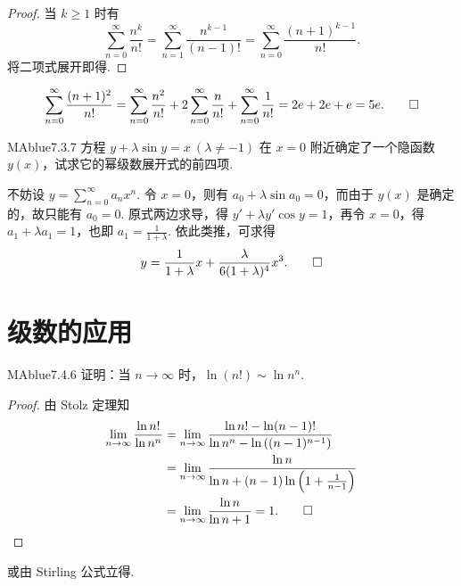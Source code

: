 \begin{enumerate}
\begin{solution}
\begin{center}
\begin{minipage}{0.85\textwidth}
\begin{lemma}{}{}
\begin{proof}
                        当 $k \geqslant 1$ 时有
                        \[
                            \sum_{n=0}^\infty \frac{n^k}{n!} = \sum_{n=1}^\infty \frac{n^{k-1}}{(n-1)!} = \sum_{n=0}^\infty \frac{(n+1)^{k-1}}{n!}.
                        \]
                        将二项式展开即得.
                    \end{proof}
                \end{lemma}
            \end{minipage}
        \end{center}
        \[
            \sum_{n=0}^{\infty} \frac{(n+1)^2}{n!} = \sum_{n=0}^{\infty} \frac{n^2}{n!} + 2 \sum_{n=0}^{\infty} \frac n {n!} + \sum_{n=0}^{\infty} \frac 1 {n!} = 2e + 2e + e = 5e. \qedhere
        \]
    \end{solution}
\end{enumerate}

\begin{problem}{MAblue}{7.3.7}
    方程 $y + \lambda \sin y = x \ (\lambda \neq -1)$ 在 $x = 0$ 附近确定了一个隐函数 $y(x)$，试求它的幂级数展开式的前四项.
\end{problem}

\begin{solution}
    不妨设 $y = \sum_{n=0}^{\infty} a_n x^n$. 令 $x = 0$，则有 $a_0 + \lambda \sin a_0 = 0$，而由于 $y(x)$ 是确定的，故只能有 $a_0 = 0$. 原式两边求导，得 $y' + \lambda y' \cos y = 1$，再令 $x = 0$，得 $a_1 + \lambda a_1 = 1$，也即 $a_1 = \frac 1 {1+\lambda}$. 依此类推，可求得
    \[
        y = \frac 1 {1 + \lambda} x + \frac{\lambda}{6 (1 + \lambda)^4} x^3. \qedhere
    \]
\end{solution}

\section{级数的应用}

\begin{problem}{MAblue}{7.4.6}
    证明：当 $n \to \infty$ 时，$\ln(n!) \sim \ln n^n$.
\end{problem}

\begin{proof}
    由 Stolz 定理知
    \begin{align*}
        \lim_{n \to \infty} \frac{\ln n!}{\ln n^n} &= \lim_{n \to \infty} \frac{\ln n! - \ln (n-1)!}{\ln n^n - \ln \left( (n-1)^{n-1} \right)} \\
        &= \lim_{n \to \infty} \frac{\ln n}{\ln n + (n-1) \ln\left( 1 + \frac 1 {n-1} \right)} \\
        &= \lim_{n \to \infty} \frac{\ln n}{\ln n + 1} = 1. \qedhere
    \end{align*}
\end{proof}
{\flushleft 或由 Stirling 公式立得.}

